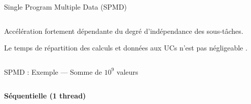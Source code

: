 \documentclass[../main.tex]{subfiles}
\begin{document}
\begin{frame}{Single Program Multiple Data (SPMD)}
\begin{columns}
\begin{column}{.6\linewidth}
      \vspace{1.4 em}

      \begin{ctrlitemize}{.5 em}
        \item Accélération fortement dépendante du degré d'indépendance des sous-tâches.
        \item Le temps de répartition des calculs et données aux UCs n'est pas négligeable \cite{hillAmdahlLawMulticore2008}.
      \end{ctrlitemize}
    \end{column}
  \end{columns}
\end{frame}

\begin{frame}{SPMD : Exemple --- Somme de $10^9$ valeurs}
  \begin{columns}
    \begin{column}{.33\linewidth}
      \begin{overlayarea}{\linewidth}{.85\textheight}
        \centering
        \textbf{Séquentielle (1 thread)} \vspace{.03\textheight}


\end{overlayarea}
\end{column}
\end{columns}
\end{frame}
\end{document}
